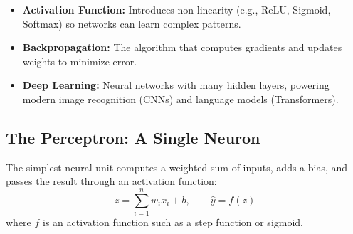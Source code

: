 \documentclass[11pt,a4paper]{article}
\begin{document}
\begin{center}
\end{center}

\begin{itemize}[leftmargin=*]
  \item \textbf{Activation Function:} Introduces non-linearity (e.g., ReLU, Sigmoid, Softmax) so networks can learn complex patterns.
  \item \textbf{Backpropagation:} The algorithm that computes gradients and updates weights to minimize error.
  \item \textbf{Deep Learning:} Neural networks with many hidden layers, powering modern image recognition (CNNs) and language models (Transformers).
\end{itemize}

\subsection{The Perceptron: A Single Neuron}
\begin{definitionbox}[Perceptron]
The simplest neural unit computes a weighted sum of inputs, adds a bias, and passes the result through an activation function:
$$
z=\sum_{i=1}^n w_i x_i + b, \qquad \hat{y}=f(z)
$$
where $f$ is an activation function such as a step function or sigmoid.
\end{definitionbox}
\end{document}
